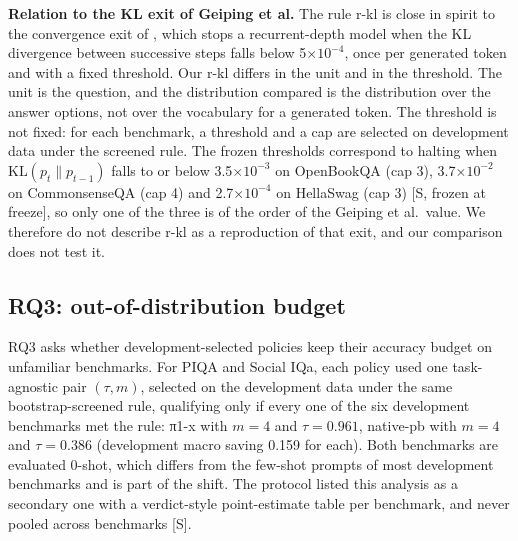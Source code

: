 \textbf{Relation to the KL exit of Geiping et al.} The rule r-kl is close in spirit to the convergence exit of \citet[section 6.1]{Geiping2025}, which stops a recurrent-depth model when the KL divergence between successive steps falls below 5\(\times 10^{-4}\), once per generated token and with a fixed threshold. Our r-kl differs in the unit and in the threshold. The unit is the question, and the distribution compared is the distribution over the answer options, not over the vocabulary for a generated token. The threshold is not fixed: for each benchmark, a threshold and a cap are selected on development data under the screened rule. The frozen thresholds correspond to halting when \(\mathrm{KL}(p_t \| p_{t-1})\) falls to or below 3.5\(\times 10^{-3}\) on OpenBookQA (cap 3), 3.7\(\times 10^{-2}\) on CommonsenseQA (cap 4) and 2.7\(\times 10^{-4}\) on HellaSwag (cap 3) {[}S, frozen at freeze{]}, so only one of the three is of the order of the Geiping et al.~value. We therefore do not describe r-kl as a reproduction of that exit, and our comparison does not test it.

\subsection{RQ3: out-of-distribution budget}

RQ3 asks whether development-selected policies keep their accuracy budget on unfamiliar benchmarks. For PIQA and Social IQa, each policy used one task-agnostic pair \((\tau, m)\), selected on the development data under the same bootstrap-screened rule, qualifying only if every one of the six development benchmarks met the rule: π1-x with \(m = 4\) and \(\tau = 0.961\), native-pb with \(m = 4\) and \(\tau = 0.386\) (development macro saving 0.159 for each). Both benchmarks are evaluated 0-shot, which differs from the few-shot prompts of most development benchmarks and is part of the shift. The protocol listed this analysis as a secondary one with a verdict-style point-estimate table per benchmark, and never pooled across benchmarks {[}S{]}.

